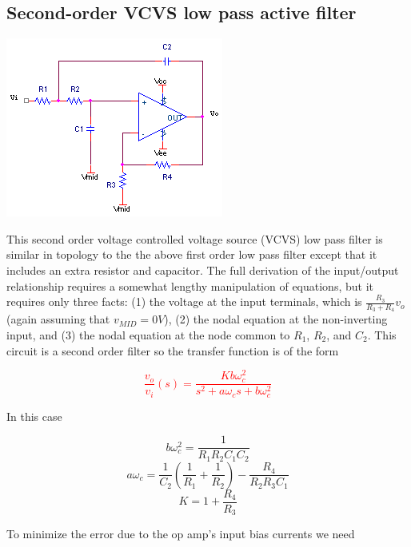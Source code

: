 \subsection{Second-order VCVS low pass active filter}
\begin{center}
	\includegraphics{schematics/2ndorder_vcvs_LPfilter.PNG}
\end{center}
This second order voltage controlled voltage source (VCVS) low pass filter is similar in topology to the the above first order low pass filter except that it includes an extra resistor and capacitor. The full derivation of the input/output relationship requires a somewhat lengthy manipulation of equations, but it requires only three facts: (1) the voltage at the input terminals, which is $\frac{R_{3}}{R_{3}+R_{4}}v_{o}$ (again assuming that $v_{MID} = 0V$), (2) the nodal equation at the non-inverting input, and (3) the nodal equation at the node common to $R_{1}$, $R_{2}$, and $C_{2}$. This circuit is a second order filter so the transfer function is of the form

\textcolor{red}{
\begin{equation}
\frac{v_{o}}{v_{i}}(s) = \frac{Kb\omega_{c}^{2}}{s^{2} + a\omega_{c}s + b\omega_{c}^{2}}
\label{eq:2ndorder_vcvs_LPfilter}
\end{equation}
}

In this case

\begin{equation}
b\omega_{c}^{2} = \frac{1}{R_{1}R_{2}C_{1}C_{2}}
\end{equation}
\begin{equation}
a\omega_{c} = \frac{1}{C_{2}}\left(\frac{1}{R_{1}} + \frac{1}{R_{2}}\right) - \frac{R_{4}}{R_{2}R_{3}C_{1}}
\end{equation}
\begin{equation}
K = 1 + \frac{R_{4}}{R_{3}}
\end{equation}

To minimize the error due to the op amp's input bias currents we need

